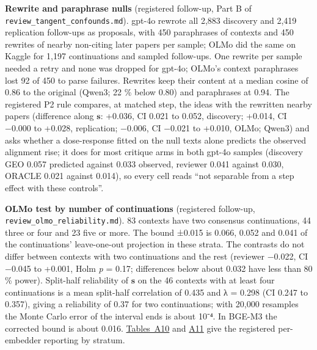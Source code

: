 \documentclass[
  10pt,
]{article}
\begin{document}
\textbf{Rewrite and paraphrase nulls}
(registered follow-up, Part B of
\texttt{review\_\allowbreak{}tangent\_\allowbreak{}confounds.md}).
gpt-4o rewrote all 2,883 discovery and
2,419 replication follow-ups as
proposals, with 450 paraphrases of
contexts and 450 rewrites of nearby
non-citing later papers per sample; OLMo
did the same on Kaggle for 1,197
continuations and sampled follow-ups.
One rewrite per sample needed a retry
and none was dropped for gpt-4o; OLMo's
context paraphrases lost 92 of 450 to
parse failures. Rewrites keep their
content at a median cosine of 0.86 to
the original (Qwen3; 22 \% below 0.80)
and paraphrases at 0.94. The registered
P2 rule compares, at matched step, the
ideas with the rewritten nearby papers
(difference along \(\mathbf{s}\):
+0.036, CI 0.021 to 0.052, discovery;
+0.014, CI −0.000 to +0.028,
replication; −0.006, CI −0.021 to
+0.010, OLMo; Qwen3) and asks whether a
dose-response fitted on the null texts
alone predicts the observed alignment
rise; it does for most critique arms in
both gpt-4o samples (discovery GEO 0.057
predicted against 0.033 observed,
reviewer 0.041 against 0.030, ORACLE
0.021 against 0.014), so every cell
reads ``not separable from a step effect
with these controls''.

\textbf{OLMo test by number of
continuations} (registered follow-up,
\texttt{review\_\allowbreak{}olmo\_\allowbreak{}reliability.md}).
83 contexts have two consensus
continuations, 44 three or four and 23
five or more. The bound ±0.015 is 0.066,
0.052 and 0.041 of the continuations'
leave-one-out projection in these
strata. The contrasts do not differ
between contexts with two continuations
and the rest (reviewer −0.022, CI −0.045
to +0.001, Holm \emph{p} = 0.17;
differences below about 0.032 have less
than 80 \% power). Split-half
reliability of \(\mathbf{s}\) on the 46
contexts with at least four
continuations is a mean split-half
correlation of 0.435 and λ = 0.298 (CI
0.247 to 0.357), giving a reliability of
0.37 for two continuations; with 20,000
resamples the Monte Carlo error of the
interval ends is about 10⁻⁴. In BGE-M3
the corrected bound is about 0.016.
\hyperref[tab:A10]{Tables~A10} and
\hyperref[tab:A11]{A11} give the
registered per-embedder reporting by
stratum.

\FloatBarrier
\end{document}
